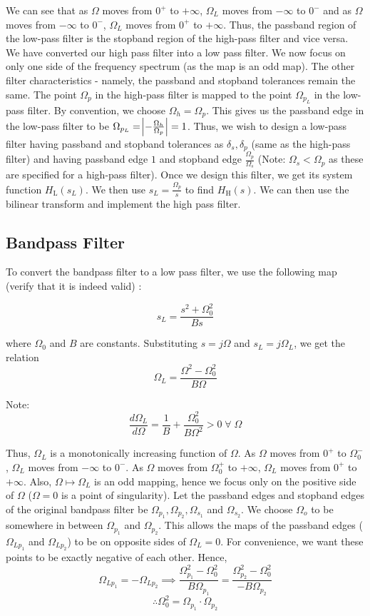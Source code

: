 \documentclass{article}
\theoremstyle{definition}
\begin{document}
We can see that as $\Omega$ moves from $0^+$ to $+\infty$, $\Omega_L$ moves from $-\infty$ to $0^-$ and as $\Omega$ moves from $-\infty$ to $0^-$, $\Omega_L$ moves from $0^+$ to $+\infty$. Thus, the passband region of the low-pass filter is the stopband region of the high-pass filter and vice versa. We have converted our high pass filter into a low pass filter. We now focus on only one side of the frequency spectrum (as the map is an odd map). The other filter characteristics - namely, the passband and stopband tolerances remain the same. The point $\Omega_p$ in the high-pass filter is mapped to the point $\Omega_{p_L}$ in the low-pass filter. By convention, we choose $\Omega_h = \Omega_p$. This gives us the passband edge in the low-pass filter to be $\Omega_{p_L} = \abs{- \frac{\Omega_h}{\Omega_p}} = 1$. Thus, we wish to design a low-pass filter having passband and stopband tolerances as $\delta_s, \delta_p$ (same as the high-pass filter) and having passband edge $1$ and stopband edge $\frac{\Omega_p}{\Omega_s}$ (Note: $\Omega_s < \Omega_p$ as these are specified for a high-pass filter). Once we design this filter, we get its system function $H_{\text{L}}(s_L)$. We then use $s_L= \frac{\Omega_p}{s}$ to find $H_{\text{H}}(s)$. We can then use the bilinear transform and implement the high pass filter.

\subsection{Bandpass Filter}

To convert the bandpass filter to a low pass filter, we use the following map (verify that it is indeed valid) :

\[
    s_L = \frac{s^2 + \Omega_0^2}{B s}
\]

where $\Omega_0$ and $B$ are constants. Substituting $s = j\Omega$ and $s_L = j \Omega_L$, we get the relation 
\[
    \boxed{\Omega_L = \frac{\Omega^2 - \Omega_0^2}{B \Omega}}
\]

Note:
\[
    \frac{d \Omega_L}{d \Omega} = \frac{1}{B} + \frac{\Omega_0^2}{B \Omega^2} > 0 \; \forall \; \Omega
\]

Thus, $\Omega_L$ is a monotonically increasing function of $\Omega$. As $\Omega$ moves from $0^{+}$ to $\Omega_{0}^{-}$, $\Omega_L$ moves from $-\infty$ to $0^{-}$. As $\Omega$ moves from $\Omega_{0}^{+}$ to $+\infty$, $\Omega_L$ moves from $0^{+}$ to $+\infty$. Also, $\Omega \mapsto \Omega_L$ is an odd mapping, hence we focus only on the positive side of $\Omega$ ($\Omega = 0$ is a point of singularity). Let the passband edges and stopband edges of the original bandpass filter be $\Omega_{p_1} , \Omega_{p_2} , \Omega_{s_1}$ and $\Omega_{s_2}$. We choose $\Omega_o$ to be somewhere in between $\Omega_{p_1}$ and $\Omega_{p_2}$. This allows the maps of the passband edges ($\Omega_{Lp_1}$ and $\Omega_{Lp_2}$) to be on opposite sides of $\Omega_L =0$. For convenience, we want these points to be exactly negative of each other. Hence, 
\[
    \Omega_{Lp_1} = -\Omega_{Lp_2} \implies \frac{\Omega_{p_1}^2 - \Omega_0^2}{B \Omega_{p_1}} = \frac{\Omega_{p_2}^2 - \Omega_0^2}{- B \Omega_{p_2}}
\]
\[
    \therefore \boxed{\Omega_0^2 = \Omega_{p_1} \cdot \Omega_{p_2}}
\]
\end{document}
